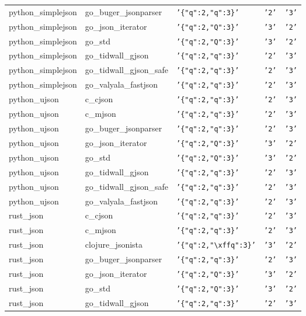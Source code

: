 \documentclass[english, 12pt, a4paper, sci, utf8, a-2b, online]{aaltothesis}
\def\str#1{\texttt{'#1'}}
\begin{document}
\begin{longtable}{lllll}
    python\_simplejson & go\_buger\_jsonparser & \str{\{"q":2,"q":3\}} & \str{2} & \str{3} \\
    python\_simplejson & go\_json\_iterator & \str{\{"q":2,"Q":3\}} & \str{3} & \str{2} \\
    python\_simplejson & go\_std & \str{\{"q":2,"Q":3\}} & \str{3} & \str{2} \\
    python\_simplejson & go\_tidwall\_gjson & \str{\{"q":2,"q":3\}} & \str{2} & \str{3} \\
    python\_simplejson & go\_tidwall\_gjson\_safe & \str{\{"q":2,"q":3\}} & \str{2} & \str{3} \\
    python\_simplejson & go\_valyala\_fastjson & \str{\{"q":2,"q":3\}} & \str{2} & \str{3} \\
    python\_ujson & c\_cjson & \str{\{"q":2,"q":3\}} & \str{2} & \str{3} \\
    python\_ujson & c\_mjson & \str{\{"q":2,"q":3\}} & \str{2} & \str{3} \\
    python\_ujson & go\_buger\_jsonparser & \str{\{"q":2,"q":3\}} & \str{2} & \str{3} \\
    python\_ujson & go\_json\_iterator & \str{\{"q":2,"Q":3\}} & \str{3} & \str{2} \\
    python\_ujson & go\_std & \str{\{"q":2,"Q":3\}} & \str{3} & \str{2} \\
    python\_ujson & go\_tidwall\_gjson & \str{\{"q":2,"q":3\}} & \str{2} & \str{3} \\
    python\_ujson & go\_tidwall\_gjson\_safe & \str{\{"q":2,"q":3\}} & \str{2} & \str{3} \\
    python\_ujson & go\_valyala\_fastjson & \str{\{"q":2,"q":3\}} & \str{2} & \str{3} \\
    rust\_json & c\_cjson & \str{\{"q":2,"q":3\}} & \str{2} & \str{3} \\
    rust\_json & c\_mjson & \str{\{"q":2,"q":3\}} & \str{2} & \str{3} \\
    rust\_json & clojure\_jsonista & \str{\{"q":2,"\textbackslash xffq":3\}} & \str{3} & \str{2} \\
    rust\_json & go\_buger\_jsonparser & \str{\{"q":2,"q":3\}} & \str{2} & \str{3} \\
    rust\_json & go\_json\_iterator & \str{\{"q":2,"Q":3\}} & \str{3} & \str{2} \\
    rust\_json & go\_std & \str{\{"q":2,"Q":3\}} & \str{3} & \str{2} \\
    rust\_json & go\_tidwall\_gjson & \str{\{"q":2,"q":3\}} & \str{2} & \str{3} \\

\end{longtable}
\end{document}
